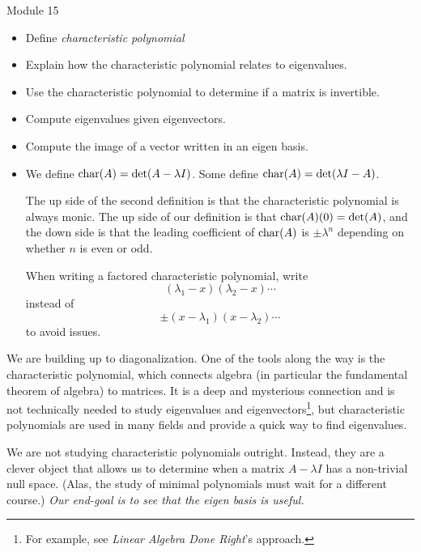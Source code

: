 \begin{lesson}

	Module 15

	\begin{itemize}
		\item Define \emph{characteristic polynomial}
		\item Explain how the characteristic polynomial relates to eigenvalues.
		\item Use the characteristic polynomial to determine if a matrix is invertible.
		\item Compute eigenvalues given eigenvectors.
		\item Compute the image of a vector written in an eigen basis.
	\end{itemize}

	\begin{annotation}
		\begin{notes}
			\begin{itemize}
				\item We define $\operatorname{char}(A)=\det(A-\lambda I)$.
					Some define $\operatorname{char}(A)=\det(\lambda I-A)$.

					The up side of the second definition is
					that the characteristic polynomial is always monic.
					The up side of our definition is that
					$\operatorname{char}(A)(0)=\det(A)$, and the down side is that
					the leading coefficient of $\operatorname{char}(A)$ is $\pm\lambda^n$ depending
					on whether $n$ is even or odd.

					When writing a factored characteristic polynomial, write
					\[
						(\lambda_1-x)(\lambda_2-x)\cdots
					\]
					instead of
					\[
						\pm(x-\lambda_1)(x-\lambda_2)\cdots
					\]
					to avoid issues.
			\end{itemize}
		\end{notes}
	\end{annotation}
	We are building up to diagonalization. One of the tools along the way is the characteristic polynomial,
	which connects algebra (in particular the fundamental theorem of algebra) to matrices. It is a deep
	and mysterious connection and is not technically needed to study eigenvalues and eigenvectors\footnote{
		For example, see \emph{Linear Algebra Done Right}'s approach.}, but characteristic polynomials
	are used in many fields and provide a quick way to find eigenvalues.

	We are not studying characteristic polynomials outright. Instead, they are a clever object
	that allows us to determine when a matrix $A-\lambda I$ has a non-trivial null space. (Alas, the
	study of minimal polynomials must wait for a different course.)
	\emph{Our end-goal is to see that the eigen basis is useful.}

\end{lesson}
